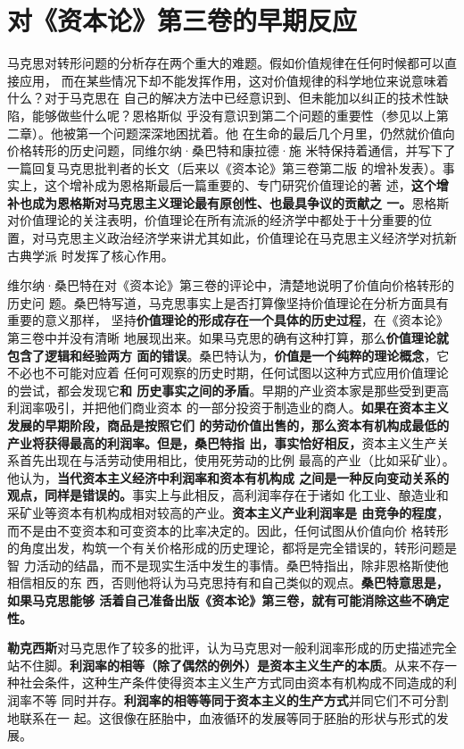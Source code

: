 \section{对《资本论》第三卷的早期反应}
马克思对转形问题的分析存在两个重大的难题。假如价值规律在任何时候都可以直接应用，
而在某些情况下却不能发挥作用，这对价值规律的科学地位来说意味着什么？对于马克思在
自己的解决方法中已经意识到、但未能加以纠正的技术性缺陷，能够做些什么呢？恩格斯似
乎没有意识到第二个问题的重要性（参见以上第二章）。他被第一个问题深深地困扰着。他
在生命的最后几个月里，仍然就价值向价格转形的历史问题，同维尔纳·桑巴特和康拉德·施
米特保持着通信，并写下了一篇回复马克思批判者的长文（后来以《资本论》第三卷第二版
的增补发表）。事实上，这个增补成为恩格斯最后一篇重要的、专门研究价值理论的著
述，\textbf{这个增补也成为恩格斯对马克思主义理论最有原创性、也最具争议的贡献之
  一。}恩格斯对价值理论的关注表明，价值理论在所有流派的经济学中都处于十分重要的位
置，对马克思主义政治经济学来讲尤其如此，价值理论在马克思主义经济学对抗新古典学派
时发挥了核心作用。

维尔纳·桑巴特在对《资本论》第三卷的评论中，清楚地说明了价值向价格转形的历史问
题。桑巴特写道，马克思事实上是否打算像坚持价值理论在分析方面具有重要的意义那样，
坚持\textbf{价值理论的形成存在一个具体的历史过程}，在《资本论》第三卷中并没有清晰
地展现出来。如果马克思的确有这种打算，那么\textbf{价值理论就包含了逻辑和经验两方
  面的错误}。桑巴特认为，\textbf{价值是一个纯粹的理论概念}，它不必也不可能对应着
任何可观察的历史时期，任何试图以这种方式应用价值理论的尝试，都会发现它\textbf{和
  历史事实之间的矛盾}。早期的产业资本家是那些受到更高利润率吸引，并把他们商业资本
的一部分投资于制造业的商人。\textbf{如果在资本主义发展的早期阶段，商品是按照它们
  的劳动价值出售的，那么资本有机构成最低的产业将获得最高的利润率。但是，桑巴特指
  出，事实恰好相反，}资本主义生产关系首先出现在与活劳动使用相比，使用死劳动的比例
最高的产业（比如采矿业）。他认为，\textbf{当代资本主义经济中利润率和资本有机构成
  之间是一种反向变动关系的观点，同样是错误的。}事实上与此相反，高利润率存在于诸如
化工业、酿造业和采矿业等资本有机构成相对较高的产业。\textbf{资本主义产业利润率是
  由竞争的程度}，而不是由不变资本和可变资本的比率决定的。因此，任何试图从价值向价
格转形的角度出发，构筑一个有关价格形成的历史理论，都将是完全错误的，转形问题是智
力活动的结晶，而不是现实生活中发生的事情。桑巴特指出，除非恩格斯使他相信相反的东
西，否则他将认为马克思持有和自己类似的观点。\textbf{桑巴特意思是，如果马克思能够
  活着自己准备出版《资本论》第三卷，就有可能消除这些不确定性。}

\textbf{勒克西斯}对马克思作了较多的批评，认为马克思对一般利润率形成的历史描述完全
站不住脚。\textbf{利润率的相等（除了偶然的例外）是资本主义生产的本质}。从来不存一
种社会条件，这种生产条件使得资本主义生产方式同由资本有机构成不同造成的利润率不等
同时并存。\textbf{利润率的相等等同于资本主义的生产方式}并同它们不可分割地联系在一
起。这很像在胚胎中，血液循环的发展等同于胚胎的形状与形式的发展。

